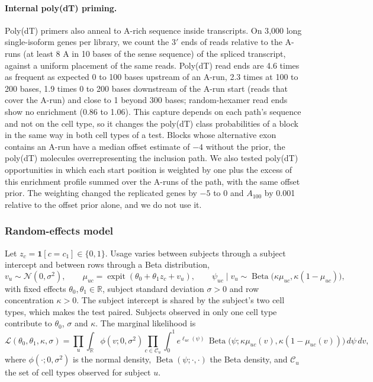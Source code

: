 \documentclass[11pt]{article}
\newcommand{\expit}{\operatorname{expit}}
\newcommand{\BetaDist}{\operatorname{Beta}}
\begin{document}
\paragraph{Internal poly(dT) priming.} Poly(dT) primers also anneal to A-rich sequence inside transcripts. On 3{,}000 long single-isoform genes per library, we count the 3$'$ ends of reads relative to the A-runs (at least 8 A in 10 bases of the sense sequence) of the spliced transcript, against a uniform placement of the same reads. Poly(dT) read ends are 4.6 times as frequent as expected 0 to 100 bases upstream of an A-run, 2.3 times at 100 to 200 bases, 1.9 times 0 to 200 bases downstream of the A-run start (reads that cover the A-run) and close to 1 beyond 300 bases; random-hexamer read ends show no enrichment (0.86 to 1.06). This capture depends on each path's sequence and not on the cell type, so it changes the poly(dT) class probabilities of a block in the same way in both cell types of a test. Blocks whose alternative exon contains an A-run have a median offset estimate of $-4$ without the prior, the poly(dT) molecules overrepresenting the inclusion path. We also tested poly(dT) opportunities in which each start position is weighted by one plus the excess of this enrichment profile summed over the A-runs of the path, with the same offset prior. The weighting changed the replicated genes by $-5$ to 0 and $A_{100}$ by 0.001 relative to the offset prior alone, and we do not use it.

\subsubsection{Random-effects model}

Let $z_c=\mathbf 1[c=c_1]\in\{0,1\}$. Usage varies between subjects through a subject intercept and between rows through a Beta distribution, \[v_u\sim\mathcal N(0,\sigma^2),\qquad \mu_{uc}=\expit(\theta_0+\theta_1z_c+v_u),\qquad \psi_{uc}\mid v_u\sim\BetaDist\big(\kappa\mu_{uc},\kappa(1-\mu_{uc})\big),\] with fixed effects $\theta_0,\theta_1\in\mathbb R$, subject standard deviation $\sigma>0$ and row concentration $\kappa>0$. The subject intercept is shared by the subject's two cell types, which makes the test paired. Subjects observed in only one cell type contribute to $\theta_0$, $\sigma$ and $\kappa$. The marginal likelihood is \[\mathcal L(\theta_0,\theta_1,\kappa,\sigma)=\prod_u\int_{\mathbb R}\phi(v;0,\sigma^2)\prod_{c\in\mathcal C_u}\int_0^1e^{\ell_{uc}(\psi)}\,\BetaDist\big(\psi;\kappa\mu_{uc}(v),\kappa(1-\mu_{uc}(v))\big)\,d\psi\,dv,\] where $\phi(\cdot;0,\sigma^2)$ is the normal density, $\BetaDist(\psi;\cdot,\cdot)$ the Beta density, and $\mathcal C_u$ the set of cell types observed for subject $u$.
\end{document}
